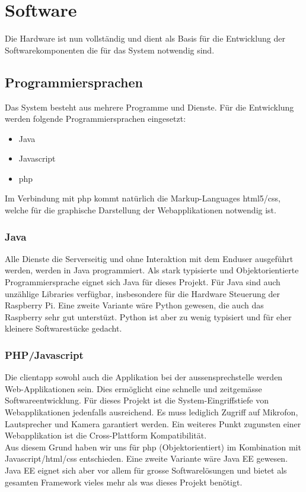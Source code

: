 \section{Software}
\label{sec:chapterexample}
Die Hardware ist nun vollständig und dient als Basis für die Entwicklung der Softwarekomponenten die für das System notwendig sind. 
\subsection{Programmiersprachen}
Das System besteht aus mehrere Programme und Dienste. Für die Entwicklung werden folgende Programmiersprachen eingesetzt:
\begin{itemize}
	\item Java
	\item Javascript
	\item \gls{php}
\end{itemize}
Im Verbindung mit \gls{php} kommt natürlich die Markup-Languages \gls{html}5/\gls{css}, welche für die graphische Darstellung der Webapplikationen notwendig ist.

\subsubsection{Java}
\label{kap:java}
Alle Dienste die Serverseitig und ohne Interaktion mit dem Enduser ausgeführt werden, werden in Java programmiert. Als stark typisierte und Objektorientierte Programmiersprache eignet sich Java für dieses Projekt. Für Java sind auch unzählige Libraries verfügbar, insbesondere für die Hardware Steuerung der Raspberry Pi. Eine zweite Variante wäre Python gewesen, die auch das Raspberry sehr gut unterstüzt. Python ist aber zu wenig typisiert und für eher kleinere Softwarestücke gedacht.

\subsubsection{PHP/Javascript}
Die \gls{clientapp} sowohl auch die Applikation bei der \gls{aussensprechstelle} werden Web-Applikationen sein. Dies ermöglicht eine schnelle und zeitgemässe Softwareentwicklung. Für dieses Projekt ist die System-Eingriffstiefe von Webapplikationen jedenfalls ausreichend. Es muss lediglich Zugriff auf Mikrofon, Lautsprecher und Kamera garantiert werden. Ein weiteres Punkt zugunsten einer Webapplikation ist die Cross-Plattform Kompatibilität.
\\
Aus diesem Grund haben wir uns für \gls{php} (Objektorientiert) im Kombination mit Javascript/\gls{html}/\gls{css} entschieden. Eine zweite Variante wäre Java EE gewesen. Java EE eignet sich aber vor allem für grosse Softwarelösungen und bietet als gesamten Framework vieles mehr als was dieses Projekt benötigt.
\\
